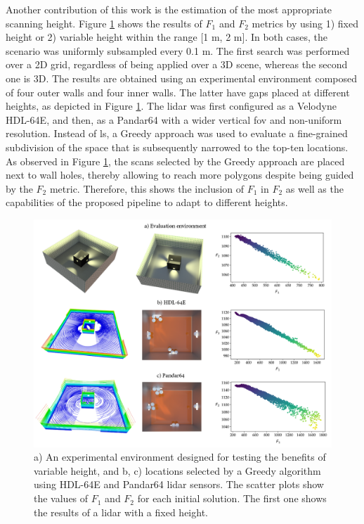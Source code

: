 Another contribution of this work is the estimation of the most appropriate scanning height. Figure \ref{fig:cubicle_room} shows the results of $F_1$ and $F_2$ metrics by using 1) fixed height or 2) variable height within the range [1 \si{\meter}, 2 \si{\meter}]. In both cases, the scenario was uniformly subsampled every 0.1 \si{\meter}. The first search was performed over a 2D grid, regardless of being applied over a 3D scene, whereas the second one is 3D. The results are obtained using an experimental environment composed of four outer walls and four inner walls. The latter have gaps placed at different heights, as depicted in Figure \ref{fig:cubicle_room}. The \acrshort{lidar} was first configured as a Velodyne HDL-64E, and then, as a Pandar64 with a wider vertical \acrshort{fov} and non-uniform resolution. Instead of \acrshort{ls}, a Greedy approach was used to evaluate a fine-grained subdivision of the space that is subsequently narrowed to the top-ten locations. As observed in Figure \ref{fig:cubicle_room}, the scans selected by the Greedy approach are placed next to wall holes, thereby allowing to reach more polygons despite being guided by the $F_2$ metric. Therefore, this shows the inclusion of $F_1$ in $F_2$ as well as the capabilities of the proposed pipeline to adapt to different heights.

\begin{figure}
    \centering
    \includegraphics[width=\linewidth]{figs/lidar_optimization/height_variability.png}
	\caption{a) An experimental environment designed for testing the benefits of variable height, and b, c) locations selected by a Greedy algorithm using HDL-64E and Pandar64 \acrshort{lidar} sensors. The scatter plots show the values of $F_1$ and $F_2$ for each initial solution. The first one shows the results of a \acrshort{lidar} with a fixed height. }
	\label{fig:cubicle_room}
\end{figure}

